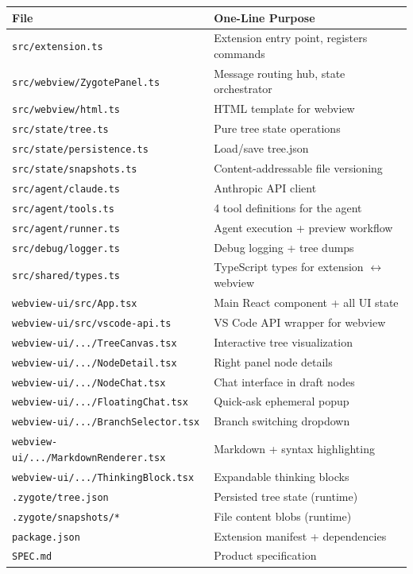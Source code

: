 \documentclass[12pt, a4paper]{article}
\begin{document}
\begin{longtable}{@{}p{6cm}p{7.5cm}@{}}
\toprule
\textbf{File} & \textbf{One-Line Purpose} \\
\midrule
\endhead
\texttt{src/extension.ts} & Extension entry point, registers commands \\
\texttt{src/webview/ZygotePanel.ts} & Message routing hub, state orchestrator \\
\texttt{src/webview/html.ts} & HTML template for webview \\
\texttt{src/state/tree.ts} & Pure tree state operations \\
\texttt{src/state/persistence.ts} & Load/save tree.json \\
\texttt{src/state/snapshots.ts} & Content-addressable file versioning \\
\texttt{src/agent/claude.ts} & Anthropic API client \\
\texttt{src/agent/tools.ts} & 4 tool definitions for the agent \\
\texttt{src/agent/runner.ts} & Agent execution + preview workflow \\
\texttt{src/debug/logger.ts} & Debug logging + tree dumps \\
\texttt{src/shared/types.ts} & TypeScript types for extension $\leftrightarrow$ webview \\
\texttt{webview-ui/src/App.tsx} & Main React component + all UI state \\
\texttt{webview-ui/src/vscode-api.ts} & VS Code API wrapper for webview \\
\texttt{webview-ui/.../TreeCanvas.tsx} & Interactive tree visualization \\
\texttt{webview-ui/.../NodeDetail.tsx} & Right panel node details \\
\texttt{webview-ui/.../NodeChat.tsx} & Chat interface in draft nodes \\
\texttt{webview-ui/.../FloatingChat.tsx} & Quick-ask ephemeral popup \\
\texttt{webview-ui/.../BranchSelector.tsx} & Branch switching dropdown \\
\texttt{webview-ui/.../MarkdownRenderer.tsx} & Markdown + syntax highlighting \\
\texttt{webview-ui/.../ThinkingBlock.tsx} & Expandable thinking blocks \\
\texttt{.zygote/tree.json} & Persisted tree state (runtime) \\
\texttt{.zygote/snapshots/*} & File content blobs (runtime) \\
\texttt{package.json} & Extension manifest + dependencies \\
\texttt{SPEC.md} & Product specification \\
\bottomrule
\end{longtable}
\end{document}
